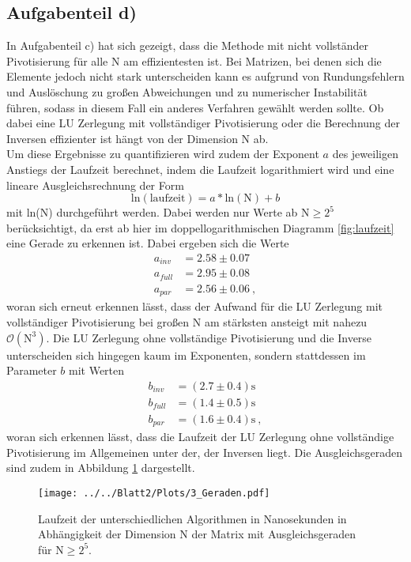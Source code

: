 \subsection*{Aufgabenteil d)}
In Aufgabenteil c) hat sich gezeigt, dass die Methode mit nicht vollständer Pivotisierung für alle N am effizientesten ist. Bei Matrizen, bei denen sich die Elemente jedoch nicht stark unterscheiden kann es aufgrund von
Rundungsfehlern und Auslöschung zu großen Abweichungen und zu numerischer Instabilität führen, sodass in diesem Fall ein anderes Verfahren gewählt werden sollte. Ob dabei eine LU Zerlegung mit vollständiger Pivotisierung oder die Berechnung der Inversen effizienter ist hängt von der Dimension N ab. \\
Um diese Ergebnisse zu quantifizieren wird zudem der Exponent $a$ des jeweiligen Anstiegs der Laufzeit berechnet, indem die Laufzeit logarithmiert wird und eine lineare Ausgleichsrechnung der Form
\begin{equation}
  \text{ln}(\text{laufzeit})=a*\text{ln}(\text{N})+b
\end{equation}
mit ln(N) durchgeführt werden. Dabei werden nur Werte ab N$\geq2^5$ berücksichtigt, da erst ab hier im doppellogarithmischen Diagramm \ref{fig:laufzeit} eine Gerade zu erkennen ist. Dabei ergeben sich die Werte
\begin{align*}
  a_{inv}&= 2.58 \pm 0.07\\
  a_{full}&= 2.95 \pm 0.08\\
  a_{par}&= 2.56 \pm 0.06 \: ,
\end{align*}
woran sich erneut erkennen lässt, dass der Aufwand für die LU Zerlegung mit vollständiger Pivotisierung
bei großen N am stärksten ansteigt mit nahezu $\mathcal{O}(\text{N}^3)$. Die LU Zerlegung ohne vollständige Pivotisierung und die Inverse unterscheiden sich hingegen kaum im Exponenten, sondern stattdessen im Parameter $b$ mit Werten
\begin{align*}
  b_{inv}&= (2.7 \pm 0.4)\text{s} \\
  b_{full}&= (1.4 \pm 0.5)\text{s} \\
  b_{par}&= (1.6 \pm 0.4)\text{s} \: ,
\end{align*}
woran sich erkennen lässt, dass die Laufzeit der LU Zerlegung ohne vollständige Pivotisierung im Allgemeinen unter der, der Inversen liegt. Die Ausgleichsgeraden sind zudem in Abbildung \ref{fig:gerade} dargestellt.
\begin{figure}[H]
  \centering
  \texttt{[image: ../../Blatt2/Plots/3\_Geraden.pdf]}
  \caption{Laufzeit der unterschiedlichen Algorithmen in Nanosekunden in Abhängigkeit der Dimension N der Matrix mit Ausgleichsgeraden für N$\geq2^5$.}
  \label{fig:gerade}
\end{figure}
